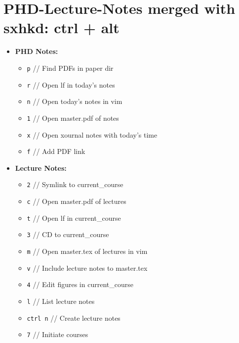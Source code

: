 \documentclass{article}
\begin{document}
\section*{PHD-Lecture-Notes merged with sxhkd: ctrl + alt}
\begin{multicols}{2} %
\begin{itemize}[leftmargin=*]
    \item \textbf{PHD Notes:}
    \begin{itemize}[label={}]
        \item \texttt{p} // Find PDFs in paper dir
        \item \texttt{r} // Open lf in today's notes
        \item \texttt{n} // Open today's notes in vim
        \item \texttt{1} // Open master.pdf of notes
        \item \texttt{x} // Open xournal notes with today's time
        \item \texttt{f} // Add PDF link
    \end{itemize}

    \item \textbf{Lecture Notes:}
    \begin{itemize}[label={}]
        \item \texttt{2} // Symlink to current\_course
        \item \texttt{c} // Open master.pdf of lectures
        \item \texttt{t} // Open lf in current\_course
        \item \texttt{3} // CD to current\_course
        \item \texttt{m} // Open master.tex of lectures in vim
        \item \texttt{v} // Include lecture notes to master.tex
        \item \texttt{4} // Edit figures in current\_course
        \item \texttt{l} // List lecture notes
        \item \texttt{ctrl n} // Create lecture notes
        \item \texttt{7} // Initiate courses
    \end{itemize}
\end{itemize}
\end{multicols}
\end{document}
